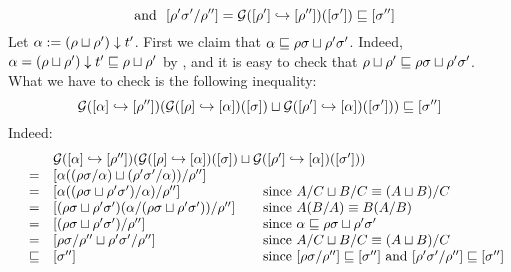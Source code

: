 \begin{enumerate}
\begin{enumerate}
\begin{enumerate}
\[        \ \text{ and }\ %
        \cls{\redseq'\redseqtwo'/\redseq''} = \ulbG(\pt{\cls{\redseq''}}{\cls{\redseq'}})(\cls{\redseqtwo'}) \permle \cls{\redseqtwo''}
      \]
      Let $\alpha := (\rho \sqcup \rho') \downarrow t'$.
      First we claim that $\alpha \sqsubseteq \rho\sigma \sqcup \rho'\sigma'$.
      Indeed, $\alpha = (\rho \sqcup \rho') \downarrow t' \sqsubseteq \rho \sqcup \rho'$
      by , and it is easy to check that
      $\rho \sqcup \rho' \sqsubseteq \rho\sigma \sqcup \rho'\sigma'$.
      What we have to check is the following inequality:
      \[
        \mathcal{G}({[\alpha]} \hookrightarrow {[\rho'']})(
          \mathcal{G}({[\rho]} \hookrightarrow {[\alpha]})({[\sigma]})
          \sqcup
          \mathcal{G}({[\rho']} \hookrightarrow {[\alpha]})({[\sigma']})
        )
        \sqsubseteq
        {[\sigma'']}
      \]
      Indeed:
      \[
        \begin{array}{rcll}
        &&
        \ulbG(\pt{\cls{\redseq''}}{\cls{\alpha}})(
          \ulbG(\pt{\cls{\alpha}}{\cls{\redseq}})(\cls{\redseqtwo})
          \sqcup
          \ulbG(\pt{\cls{\alpha}}{\cls{\redseq'}})(\cls{\redseqtwo'})
        ) \\
        & = &
        \cls{\alpha((\redseq\redseqtwo/\alpha) \sqcup (\redseq'\redseqtwo'/\alpha))/\redseq''}
        \\
        & = &
        \cls{\alpha((\redseq\redseqtwo \sqcup \redseq'\redseqtwo')/\alpha)/\redseq''}
        &\hspace{-3cm} \text{since $A/C \sqcup B/C \permeq (A \sqcup B)/C$}
        \\
        & = &
        \cls{(\redseq\redseqtwo \sqcup \redseq'\redseqtwo')(\alpha/(\redseq\redseqtwo \sqcup \redseq'\redseqtwo'))/\redseq''}
        &\hspace{-3cm} \text{since $A(B/A) \permeq B(A/B)$}
        \\
        & = &
        \cls{(\redseq\redseqtwo \sqcup \redseq'\redseqtwo')/\redseq''}
        &\hspace{-3cm} \text{since $\alpha \permle \redseq\redseqtwo \sqcup \redseq'\redseqtwo'$}
        \\
        & = &
        \cls{\redseq\redseqtwo/\redseq'' \sqcup \redseq'\redseqtwo'/\redseq''}
        &\hspace{-3cm} \text{since $A/C \sqcup B/C \permeq (A \sqcup B)/C$}
        \\
        & \permle &
        \cls{\redseqtwo''}
        &\hspace{-3cm} \text{since $\cls{\redseq\redseqtwo/\redseq''} \permle \cls{\redseqtwo''}$ and $\cls{\redseq'\redseqtwo'/\redseq''} \permle \cls{\redseqtwo''}$}
        \end{array}
      \]
    \end{enumerate}
  \end{enumerate}


\end{enumerate}
